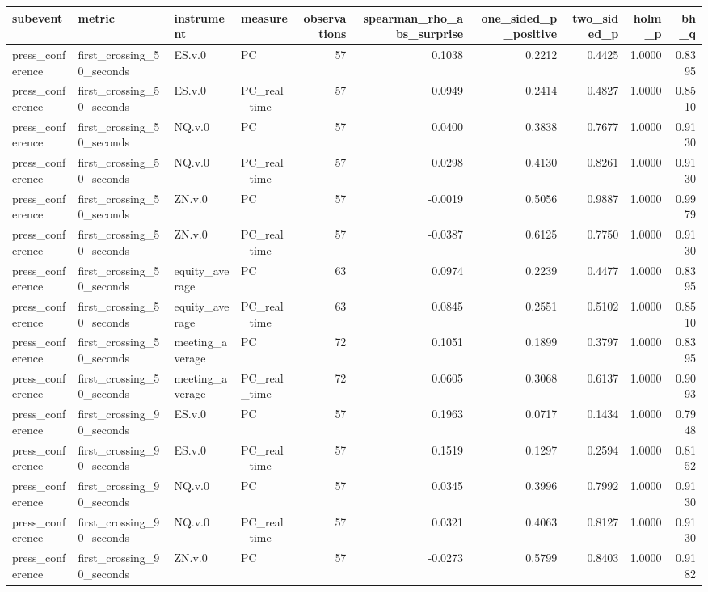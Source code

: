 \begin{tabular}{llllrrrrrr}
\toprule
subevent & metric & instrument & measure & observations & spearman_rho_abs_surprise & one_sided_p_positive & two_sided_p & holm_p & bh_q \\
\midrule
press_conference & first_crossing_50_seconds & ES.v.0 & PC & 57 & 0.1038 & 0.2212 & 0.4425 & 1.0000 & 0.8395 \\
press_conference & first_crossing_50_seconds & ES.v.0 & PC_real_time & 57 & 0.0949 & 0.2414 & 0.4827 & 1.0000 & 0.8510 \\
press_conference & first_crossing_50_seconds & NQ.v.0 & PC & 57 & 0.0400 & 0.3838 & 0.7677 & 1.0000 & 0.9130 \\
press_conference & first_crossing_50_seconds & NQ.v.0 & PC_real_time & 57 & 0.0298 & 0.4130 & 0.8261 & 1.0000 & 0.9130 \\
press_conference & first_crossing_50_seconds & ZN.v.0 & PC & 57 & -0.0019 & 0.5056 & 0.9887 & 1.0000 & 0.9979 \\
press_conference & first_crossing_50_seconds & ZN.v.0 & PC_real_time & 57 & -0.0387 & 0.6125 & 0.7750 & 1.0000 & 0.9130 \\
press_conference & first_crossing_50_seconds & equity_average & PC & 63 & 0.0974 & 0.2239 & 0.4477 & 1.0000 & 0.8395 \\
press_conference & first_crossing_50_seconds & equity_average & PC_real_time & 63 & 0.0845 & 0.2551 & 0.5102 & 1.0000 & 0.8510 \\
press_conference & first_crossing_50_seconds & meeting_average & PC & 72 & 0.1051 & 0.1899 & 0.3797 & 1.0000 & 0.8395 \\
press_conference & first_crossing_50_seconds & meeting_average & PC_real_time & 72 & 0.0605 & 0.3068 & 0.6137 & 1.0000 & 0.9093 \\
press_conference & first_crossing_90_seconds & ES.v.0 & PC & 57 & 0.1963 & 0.0717 & 0.1434 & 1.0000 & 0.7948 \\
press_conference & first_crossing_90_seconds & ES.v.0 & PC_real_time & 57 & 0.1519 & 0.1297 & 0.2594 & 1.0000 & 0.8152 \\
press_conference & first_crossing_90_seconds & NQ.v.0 & PC & 57 & 0.0345 & 0.3996 & 0.7992 & 1.0000 & 0.9130 \\
press_conference & first_crossing_90_seconds & NQ.v.0 & PC_real_time & 57 & 0.0321 & 0.4063 & 0.8127 & 1.0000 & 0.9130 \\
press_conference & first_crossing_90_seconds & ZN.v.0 & PC & 57 & -0.0273 & 0.5799 & 0.8403 & 1.0000 & 0.9182 \\

\end{tabular}
